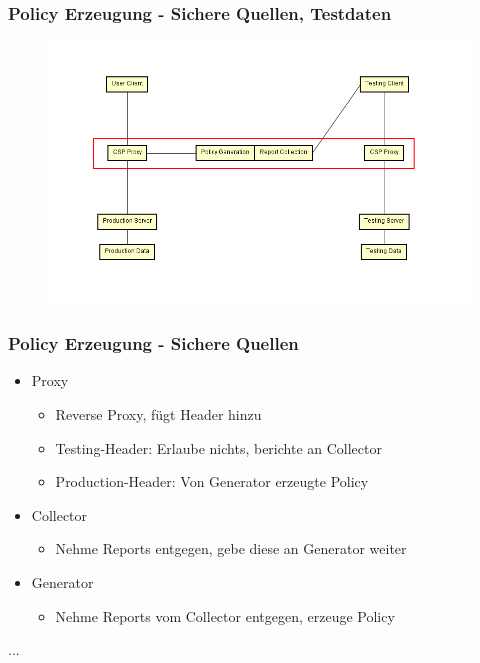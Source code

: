 \documentclass[handout]{beamer}
\begin{document}
\begin{frame}[c]
\frametitle{Policy Erzeugung - Sichere Quellen, Testdaten}
\begin{figure}[ht]
	\centering
	\includegraphics[width=12cm]{schema_2.png}
\end{figure}
\end{frame}

\begin{frame}[c]
\frametitle{Policy Erzeugung - Sichere Quellen}
\begin{itemize}
\item Proxy
\begin{itemize}
\item Reverse Proxy, fügt Header hinzu
\item Testing-Header: Erlaube nichts, berichte an Collector
\item Production-Header: Von Generator erzeugte Policy
\end{itemize}
\item Collector
\begin{itemize}
\item Nehme Reports entgegen, gebe diese an Generator weiter
\end{itemize}
\item Generator
\begin{itemize}
\item Nehme Reports vom Collector entgegen, erzeuge Policy
\end{itemize}
\end{itemize}
\end{frame}

\begin{frame}[c]
\end{frame}

\begin{thebibliography}{}
...
\end{thebibliography}
\end{document}

